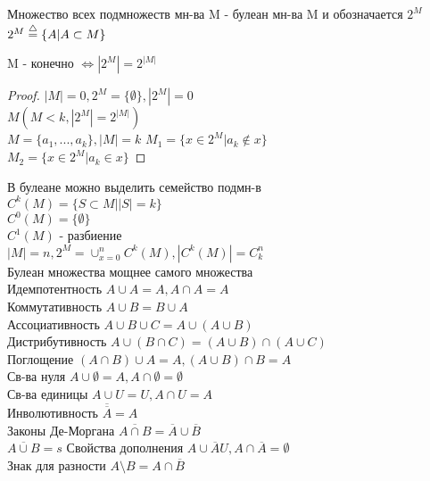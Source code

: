 Множество всех подмножеств мн-ва M - булеан мн-ва M и обозначается $ 2^M $\\
$ 2^M \stackrel{\triangle}{=} \{ A | A \subset M \} $\\
\begin{theorem}
	M - конечно $ \Leftrightarrow |2^M| = 2^{|M|} $
	\begin{proof}
		$ |M| = 0, 2^M = \{ \emptyset \}, |2^M| = 0 $ \\
		$ M (M < k, |2^{M}| = 2^{|M|}  ) $ \\
		$ M = \{ a_1, ..., a_k \}, |M| = k $
		$ M_1 = \{ x \in 2^M | a_k \notin x \} $ \\
		$ M_2 = \{ x \in 2^M | a_k \in x \}  $
	\end{proof}
\end{theorem}
В булеане можно выделить семейство подмн-в \\
$ C^k(M) = \{ S \subset M | |S| = k \} $ \\
$ C^0 (M) = \{\emptyset\} $ \\
$ C^1 (M)  $ - разбиение \\
$ |M| = n, 2^M = \cup_{x=0}^{n} C^k(M), |C^k (M)| = C_k^n $ \\
Булеан множества мощнее самого множества \\
Идемпотентность $ A \cup A = A, A \cap A = A $\\
Коммутативность $ A \cup B = B \cup A $ \\
Ассоциативность $ A \cup B \cup C  = A \cup (A \cup B )$\\
Дистрибутивность $ A \cup (B \cap C) = (A \cup B) \cap (A \cup C) $ \\
Поглощение $ (A \cap B) \cup A = A, (A \cup B) \cap B = A $ \\
Св-ва нуля $ A \cup \emptyset = A, A \cap \emptyset = \emptyset $ \\
Св-ва единицы $ A \cup U = U, A \cap U = A $ \\
Инволютивность $ \overline{\overline{A}} = A $ \\
Законы Де-Моргана $ \overline{A \cap B} = \overline{A} \cup \overline{B} $\\
$ \overline{A \cup B} = s $
Свойства дополнения $ A \cup \overline{A} U, A \cap \overline{A} = \emptyset $\\
Знак для разности $ A \setminus B = A \cap \overline{B} $ 











